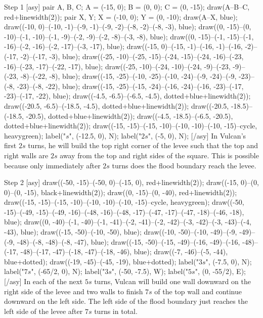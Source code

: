 \documentclass[a4paper]{article}
\begin{document}
\begin{question*}{}
{        Step 1
        [asy] pair A, B, C; A = (-15, 0); B = (0, 0); C = (0, -15); draw(A--B--C, red+linewidth(2)); pair X, Y; X = (-10, 0); Y = (0, -10); draw(A--X, blue); draw((-10, 0)--(-10, -1)--(-9, -1)--(-9, -2)--(-8, -2)--(-8, -3), blue); draw((0, -15)--(0, -10)--(-1, -10)--(-1, -9)--(-2, -9)--(-2, -8)--(-3, -8), blue); draw((0, -15)--(-1, -15)--(-1, -16)--(-2, -16)--(-2, -17)--(-3, -17), blue); draw((-15, 0)--(-15, -1)--(-16, -1)--(-16, -2)--(-17, -2)--(-17, -3), blue); draw((-25, -10)--(-25, -15)--(-24, -15)--(-24, -16)--(-23, -16)--(-23, -17)--(-22, -17), blue); draw((-25, -10)--(-24, -10)--(-24, -9)--(-23, -9)--(-23, -8)--(-22, -8), blue); draw((-15, -25)--(-10, -25)--(-10, -24)--(-9, -24)--(-9, -23)--(-8, -23)--(-8, -22), blue); draw((-15, -25)--(-15, -24)--(-16, -24)--(-16, -23)--(-17, -23)--(-17, -22), blue); draw((-4.5, -6.5)--(-6.5, -4.5), dotted+blue+linewidth(2)); draw((-20.5, -6.5)--(-18.5, -4.5), dotted+blue+linewidth(2)); draw((-20.5, -18.5)--(-18.5, -20.5), dotted+blue+linewidth(2)); draw((-4.5, -18.5)--(-6.5, -20.5), dotted+blue+linewidth(2)); draw((-15, -15)--(-15, -10)--(-10, -10)--(-10, -15)--cycle, heavygreen); label("$s$", (-12.5, 0), N); label("$2s$", (-5, 0), N); [/asy]
        In Vulcan's first $2s$ turns, he will build the top right corner of the levee such that the top and right walls are $2s$ away from the top and right sides of the square. This is possible because only immediately after $2s$ turns does the flood boundary reach the levee.


        Step 2
        [asy] draw((-50, -15)--(-50, 0)--(-15, 0), red+linewidth(2)); draw((-15, 0)--(0, 0)--(0, -15), black+linewidth(2)); draw((0, -15)--(0, -40), red+linewidth(2)); draw((-15, -15)--(-15, -10)--(-10, -10)--(-10, -15)--cycle, heavygreen); draw((-50, -15)--(-49, -15)--(-49, -16)--(-48, -16)--(-48, -17)--(-47, -17)--(-47, -18)--(-46, -18), blue); draw((0, -40)--(-1, -40)--(-1, -41)--(-2, -41)--(-2, -42)--(-3, -42)--(-3, -43)--(-4, -43), blue); draw((-15, -50)--(-10, -50), blue); draw((-10, -50)--(-10, -49)--(-9, -49)--(-9, -48)--(-8, -48)--(-8, -47), blue); draw((-15, -50)--(-15, -49)--(-16, -49)--(-16, -48)--(-17, -48)--(-17, -47)--(-18, -47)--(-18, -46), blue); draw((-7, -46)--(-5, -44), blue+dotted); draw((-19, -45)--(-45, -19), blue+dotted); label("$3s$", (-7.5, 0), N); label("$7s$", (-65/2, 0), N); label("$3s$", (-50, -7.5), W); label("$5s$", (0, -55/2), E); [/asy]
        In each of the next $5s$ turns, Vulcan will build one wall downward on the right side of the levee and two walls to finish $7s$ of the top wall and continue downward on the left side. The left side of the flood boundary just reaches the left side of the levee after $7s$ turns in total.


}
\end{question*}
\end{document}
